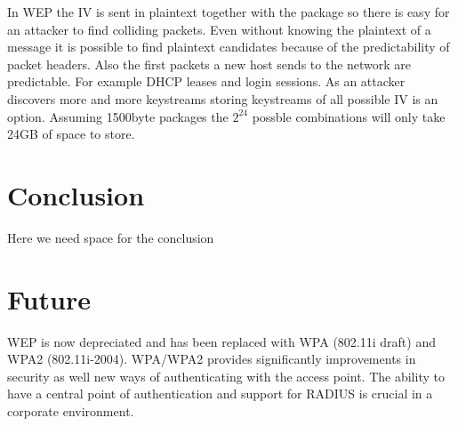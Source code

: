 \documentclass[twocolumn,11pt]{IEEEtran}
\begin{document}
In WEP the IV is sent in plaintext together with the package so there is easy for an attacker to find colliding packets. Even without knowing the plaintext of a message it is possible to find plaintext candidates because of the predictability of packet headers. Also the first packets a new host sends to the network are predictable. For example DHCP leases and login sessions. As an attacker discovers more and more keystreams storing keystreams of all possible IV is an option. Assuming 1500byte packages the $2^24$ possble combinations will only take 24GB of space to store.

\section {Conclusion}
\label{sec:conclusion}

Here we need space for the conclusion



\section {Future}
\label{sec:future}

WEP is now depreciated and has been replaced with WPA (802.11i draft) and WPA2 (802.11i-2004). WPA/WPA2 provides significantly improvements in security as well new ways of authenticating with the access point. The ability to have a central point  of authentication and support for RADIUS is crucial in a corporate environment.






\end{document}
